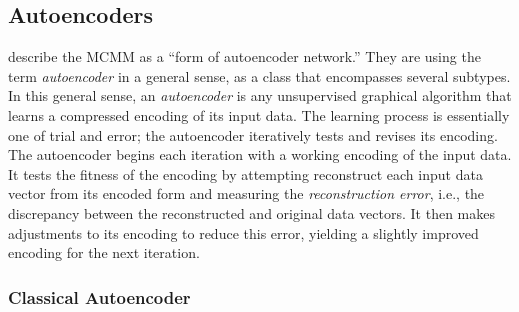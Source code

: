 \subsection{Autoencoders}
\label{sec:autoencoders}
\citet[][p. 2]{dayan-and-zemel:95} describe the MCMM as a ``form of autoencoder network.'' 
They are using the term \emph{autoencoder} in a general sense, as a class that encompasses several subtypes.  
In this general sense, an \emph{autoencoder} is any unsupervised graphical algorithm that
 learns a compressed encoding of its input data. 
The learning process is essentially one of trial and error; the autoencoder iteratively tests and revises its encoding.  
The autoencoder begins each iteration with a working encoding of the input data. It tests the fitness of the encoding by attempting reconstruct each input data vector from its encoded form and measuring the \emph{reconstruction error}, i.e., the discrepancy between the reconstructed and original data vectors.  It then makes adjustments to its encoding to reduce this error, yielding a slightly improved encoding for the next iteration. 

\subsubsection{Classical Autoencoder}
\label{sec:classical-auto}

